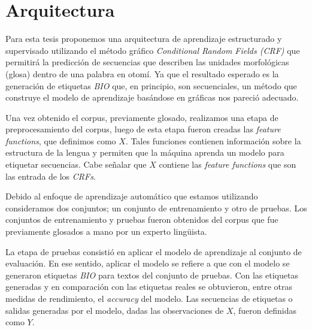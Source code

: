 \documentclass[letterpaper,12pt,oneside]{book}
\theoremstyle{definition}
\begin{document}
\section{Arquitectura}


Para esta tesis proponemos una arquitectura de aprendizaje estructurado y supervisado utilizando el método gráfico \textit{Conditional Random Fields (CRF)} que permitirá la predicción de secuencias que describen las unidades morfológicas (glosa) dentro de una palabra en otomí. Ya que el resultado esperado es la generación de etiquetas \textit{BIO} que, en principio, son secuenciales, un método que construye el modelo de aprendizaje basándose en gráficas nos pareció adecuado.

Una vez obtenido el corpus, previamente glosado, realizamos una etapa de preprocesamiento del corpus, luego de esta etapa fueron creadas las \textit{feature functions}, que definimos como $X$. Tales funciones contienen información sobre la estructura de la lengua y permiten que la máquina aprenda un modelo para etiquetar secuencias. Cabe señalar que $X$ contiene las \textit{feature functions} que son las entrada de los \textit{CRFs}.

Debido al enfoque de aprendizaje automático que estamos utilizando consideramos dos conjuntos; un conjunto de entrenamiento y otro de pruebas. Los conjuntos de entrenamiento y pruebas fueron obtenidos del corpus que fue previamente glosados a mano por un experto lingüista.

La etapa de pruebas consistió en aplicar el modelo de aprendizaje al conjunto de evaluación. En ese sentido, aplicar el modelo se refiere a que con el modelo se generaron etiquetas \textit{BIO} para textos del conjunto de pruebas. Con las etiquetas generadas y en comparación con las etiquetas reales se obtuvieron, entre otras medidas de rendimiento, el \textit{accuracy} del modelo. Las secuencias de etiquetas o salidas generadas por el modelo, dadas las observaciones de $X$, fueron definidas como $Y$.
\end{document}
